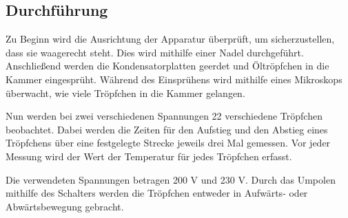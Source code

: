 \subsection{Durchführung}
\label{subsec:Durchführung}

Zu Beginn wird die Ausrichtung der Apparatur überprüft, um sicherzustellen, dass sie waagerecht steht. Dies wird mithilfe einer 
Nadel durchgeführt. Anschließend werden die Kondensatorplatten geerdet und Öltröpfchen in die Kammer eingesprüht. Während des 
Einsprühens wird mithilfe eines Mikroskops überwacht, wie viele Tröpfchen in die Kammer gelangen.

Nun werden bei zwei verschiedenen Spannungen 22 verschiedene Tröpfchen beobachtet. Dabei werden die Zeiten für den Aufstieg 
und den Abstieg eines Tröpfchens über eine festgelegte Strecke jeweils drei Mal gemessen. Vor jeder Messung wird der Wert 
der Temperatur für jedes Tröpfchen erfasst.

Die verwendeten Spannungen betragen 200 V und 230 V. Durch das Umpolen mithilfe des Schalters werden die Tröpfchen entweder 
in Aufwärts- oder Abwärtsbewegung gebracht.


